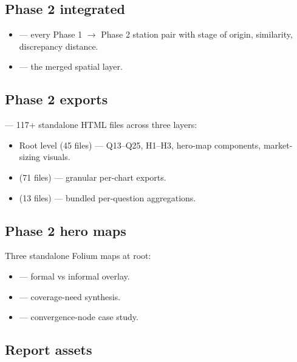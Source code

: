 \subsection{Phase 2 integrated}

\begin{itemize}\setlength{\itemsep}{0pt}
  \item {} — every Phase 1 $\to$ Phase 2 station
        pair with stage of origin, similarity, discrepancy distance.
  \item {} — the merged spatial layer.
\end{itemize}

\subsection{Phase 2 exports}

 — 117+ standalone HTML files across three layers:

\begin{itemize}
  \item Root level (45 files) — Q13--Q25, H1--H3, hero-map components,
        market-sizing visuals.
  \item {} (71 files) — granular
        per-chart exports.
  \item {} (13 files) — bundled
        per-question aggregations.
\end{itemize}

\subsection{Phase 2 hero maps}

Three standalone Folium maps at  root:

\begin{itemize}
  \item {} — formal vs informal overlay.
  \item {} — coverage-need
        synthesis.
  \item {} — convergence-node case study.
\end{itemize}

\subsection{Report assets}

